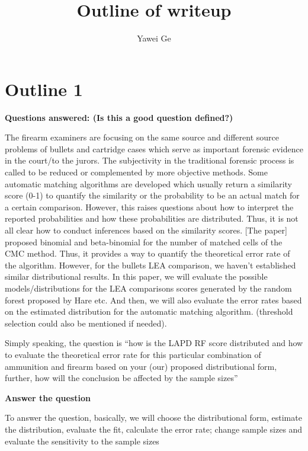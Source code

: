 \documentclass[12pt]{article}         %
\title{Outline of writeup}  %
\author{Yawei Ge}          %
\begin{document}


\maketitle             

\section*{Outline 1}

\textbf {Questions answered: (Is this a good question defined?)}
\bigskip

The firearm examiners are focusing on the same source and different source problems of bullets and cartridge cases which serve as important forensic evidence in the court/to the jurors. The subjectivity in the traditional forensic process is called to be reduced or complemented by more objective methods. Some automatic matching algorithms are developed which usually return a similarity score (0-1) to quantify the similarity or the probability to be an actual match for a certain comparison. However, this raises questions about how to interpret the reported probabilities and how these probabilities are distributed. Thus, it is not all clear how to conduct inferences based on the similarity scores. [The paper] proposed binomial and beta-binomial for the number of matched cells of the CMC method. Thus, it provides a way to quantify the theoretical error rate of the algorithm. However, for the bullets LEA comparison, we haven’t established similar distributional results. In this paper, we will evaluate the possible models/distributions for the LEA comparisons scores generated by the random forest proposed by Hare etc. And then, we will also evaluate the error rates based on the estimated distribution for the automatic matching algorithm. (threshold selection could also be mentioned if needed).

Simply speaking, the question is “how is the LAPD RF score distributed and how to evaluate the theoretical error rate for this particular combination of ammunition and firearm based on your (our) proposed distributional form, further, how will the conclusion be affected by the sample sizes”

\textbf {Answer the question}
\bigskip

To answer the question, basically, we will choose the distributional form, estimate the distribution, evaluate the fit, calculate the error rate; change sample sizes and evaluate the sensitivity to the sample sizes
\end{document}
